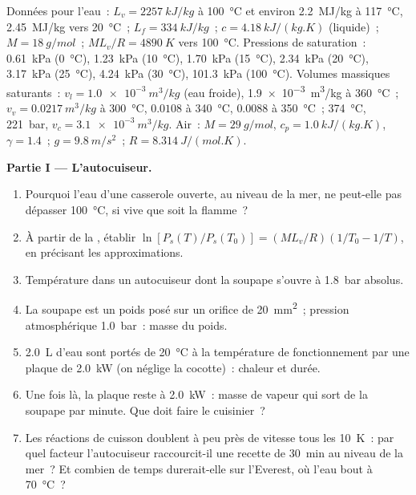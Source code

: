 \begin{problem}
\label{pb:b1:phase-changes:1}
Données pour l'eau~: $L_v = \qty{2257}{kJ/kg}$ à \qty{100}{\degreeCelsius} et
environ \qty{2.2}{MJ/kg} à \qty{117}{\degreeCelsius}, \qty{2.45}{MJ/kg} vers
\qty{20}{\degreeCelsius}~; $L_f = \qty{334}{kJ/kg}$~; $c = \qty{4.18}{kJ/(kg.K)}$
(liquide)~; $M = \qty{18}{g/mol}$~; $ML_v/R = \qty{4890}{K}$ vers
\qty{100}{\degreeCelsius}. Pressions de saturation~: \qty{0.61}{kPa}
(\qty{0}{\degreeCelsius}), \qty{1.23}{kPa} (\qty{10}{\degreeCelsius}), \qty{1.70}{kPa} (\qty{15}{\degreeCelsius}),
\qty{2.34}{kPa} (\qty{20}{\degreeCelsius}), \qty{3.17}{kPa} (\qty{25}{\degreeCelsius}), \qty{4.24}{kPa}
(\qty{30}{\degreeCelsius}), \qty{101.3}{kPa} (\qty{100}{\degreeCelsius}).
Volumes massiques saturants~: $v_l = \qty{1.0e-3}{m^3/kg}$ (eau froide),
\qty{1.9e-3}{m^3/kg} à \qty{360}{\degreeCelsius}~; $v_v = \qty{0.0217}{m^3/kg}$
à \qty{300}{\degreeCelsius}, $0.0108$ à \qty{340}{\degreeCelsius}, $0.0088$
à \qty{350}{\degreeCelsius}~;  \qty{374}{\degreeCelsius},
\qty{221}{bar}, $v_c = \qty{3.1e-3}{m^3/kg}$. Air~: $M = \qty{29}{g/mol}$, $c_p =
\qty{1.0}{kJ/(kg.K)}$, $\gamma = 1.4$~; $g = \qty{9.8}{m/s^2}$~; $R =
\qty{8.314}{J/(mol.K)}$.

\medskip
\noindent\textbf{Partie I --- L'autocuiseur.}
\begin{enumerate}
  \item Pourquoi l'eau d'une casserole ouverte, au niveau de la mer, ne
        peut-elle pas dépasser \qty{100}{\degreeCelsius}, si vive que soit la flamme~?
  \item À partir de la , établir
        $\ln[P_s(T)/P_s(T_0)] = (ML_v/R)(1/T_0 - 1/T)$, en précisant les
        approximations.
  \item Température dans un autocuiseur dont la soupape s'ouvre à
        \qty{1.8}{bar} absolus.
  \item La soupape est un poids posé sur un orifice de \qty{20}{mm^2}~;
        pression atmosphérique \qty{1.0}{bar}~: masse du poids.
  \item \qty{2.0}{L} d'eau sont portés de \qty{20}{\degreeCelsius} à la
        température de fonctionnement par une plaque de \qty{2.0}{kW} (on
        néglige la cocotte)~: chaleur et durée.
  \item Une fois là, la plaque reste à \qty{2.0}{kW}~: masse de vapeur qui
        sort de la soupape par minute. Que doit faire le cuisinier~?
  \item Les réactions de cuisson doublent à peu près de vitesse tous les
        \qty{10}{K}~: par quel facteur l'autocuiseur raccourcit-il une
        recette de \qty{30}{min} au niveau de la mer~? Et combien de temps
        durerait-elle sur l'Everest, où l'eau bout à \qty{70}{\degreeCelsius}~?
\end{enumerate}


\end{problem}
